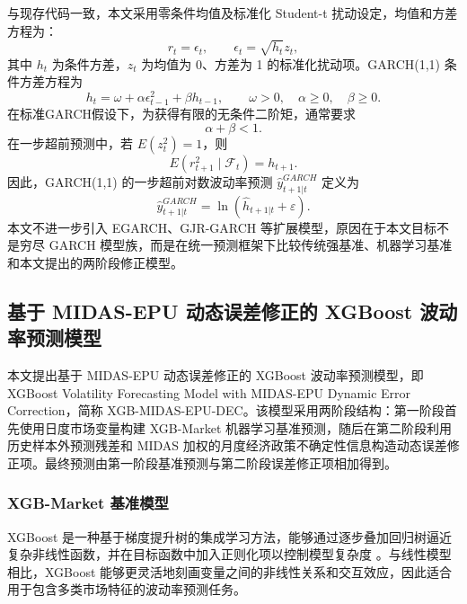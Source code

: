 与现存代码一致，本文采用零条件均值及标准化 Student-t 扰动设定，均值和方差方程为：
\begin{equation}
	r_t=\epsilon_t,
	\qquad
	\epsilon_t=\sqrt{h_t}z_t,
\end{equation}
其中 \(h_t\) 为条件方差，\(z_t\) 为均值为 0、方差为 1 的标准化扰动项。GARCH(1,1) 条件方差方程为
\begin{equation}
	h_t
	=
	\omega
	+
	\alpha \epsilon_{t-1}^{2}
	+
	\beta h_{t-1},
	\qquad
	\omega>0,\quad \alpha\geq0,\quad \beta\geq0.
\end{equation}
在标准GARCH假设下，为获得有限的无条件二阶矩，通常要求
\begin{equation}
	\alpha+\beta<1.
\end{equation}
在一步超前预测中，若 \(E(z_t^2)=1\)，则
\begin{equation}
	E(r_{t+1}^{2}\mid \mathcal{F}_t)=h_{t+1}.
\end{equation}
因此，GARCH(1,1) 的一步超前对数波动率预测 $\hat{y}^{GARCH}_{t+1|t}$ 定义为
\begin{equation}
	\hat{y}^{GARCH}_{t+1|t}
	=
	\ln(\hat{h}_{t+1|t}+\varepsilon).
\end{equation}
本文不进一步引入 EGARCH、GJR-GARCH 等扩展模型，原因在于本文目标不是穷尽 GARCH 模型族，而是在统一预测框架下比较传统强基准、机器学习基准和本文提出的两阶段修正模型。

\subsection{基于 MIDAS-EPU 动态误差修正的 XGBoost 波动率预测模型}

本文提出基于 MIDAS-EPU 动态误差修正的 XGBoost 波动率预测模型，即 XGBoost Volatility Forecasting Model with MIDAS-EPU Dynamic Error Correction，简称 XGB-MIDAS-EPU-DEC。该模型采用两阶段结构：第一阶段首先使用日度市场变量构建 XGB-Market 机器学习基准预测，随后在第二阶段利用历史样本外预测残差和 MIDAS 加权的月度经济政策不确定性信息构造动态误差修正项。最终预测由第一阶段基准预测与第二阶段误差修正项相加得到。

\subsubsection{XGB-Market 基准模型}

XGBoost 是一种基于梯度提升树的集成学习方法，能够通过逐步叠加回归树逼近复杂非线性函数，并在目标函数中加入正则化项以控制模型复杂度 \citep{ChenGuestrin2016}。与线性模型相比，XGBoost 能够更灵活地刻画变量之间的非线性关系和交互效应，因此适合用于包含多类市场特征的波动率预测任务。


